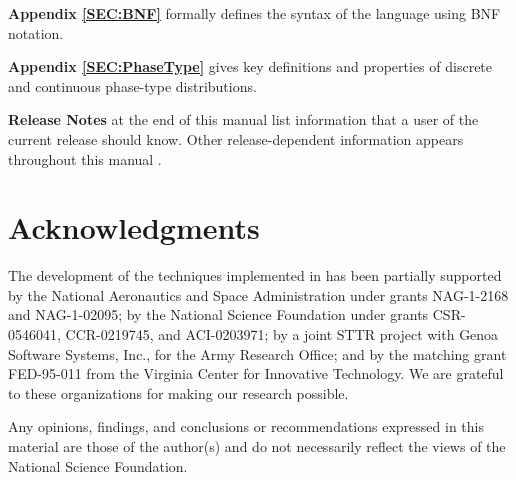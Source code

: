 \begin{description}
\item{\bf Appendix \ref{SEC:BNF}}
formally defines the syntax of the {\smart} language using BNF notation.

\item{\bf Appendix \ref{SEC:PhaseType}}
gives key definitions and properties of
discrete and continuous phase-type distributions.

\item{\bf Release Notes}
at the end of this manual list information that a user of the current
release should know.
Other release-dependent information appears throughout this manual
.

\end{description}

\vfill

\section*{\centering Acknowledgments}

The development of the techniques implemented in {\smart} has been partially
supported by the
National Aeronautics and Space Administration under grants
NAG-1-2168 and NAG-1-02095;
by the National Science Foundation under grants 
CSR-0546041, %
CCR-0219745, 
and
ACI-0203971;
by a joint STTR project with Genoa Software Systems,
Inc., for the Army Research Office;
and by the matching grant FED-95-011 from the Virginia Center for
Innovative Technology.
We are grateful to these organizations for making our research possible.

Any opinions, findings, and conclusions or recommendations expressed in this
material are those of the author(s) and do not necessarily reflect the views
of the National Science Foundation.

